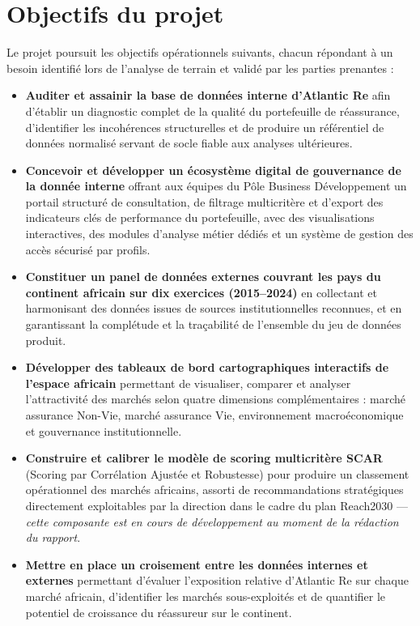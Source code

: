 \documentclass[../main.tex]{subfiles}
\begin{document}
\section{Objectifs du projet}

Le projet poursuit les objectifs opérationnels suivants, chacun répondant à un besoin identifié lors de l'analyse de terrain et validé par les parties prenantes :

\begin{itemize}[leftmargin=1.5cm, itemsep=8pt]

  \item \textbf{Auditer et assainir la base de données interne d'Atlantic Re} afin d'établir un diagnostic complet de la qualité du portefeuille de réassurance, d'identifier les incohérences structurelles et de produire un référentiel de données normalisé servant de socle fiable aux analyses ultérieures.

  \item \textbf{Concevoir et développer un écosystème digital de gouvernance de la donnée interne} offrant aux équipes du Pôle Business Développement un portail structuré de consultation, de filtrage multicritère et d'export des indicateurs clés de performance du portefeuille, avec des visualisations interactives, des modules d'analyse métier dédiés et un système de gestion des accès sécurisé par profils.

  \item \textbf{Constituer un panel de données externes couvrant les pays du continent africain sur dix exercices (2015--2024)} en collectant et harmonisant des données issues de sources institutionnelles reconnues, et en garantissant la complétude et la traçabilité de l'ensemble du jeu de données produit.

  \item \textbf{Développer des tableaux de bord cartographiques interactifs de l'espace africain} permettant de visualiser, comparer et analyser l'attractivité des marchés selon quatre dimensions complémentaires : marché assurance Non-Vie, marché assurance Vie, environnement macroéconomique et gouvernance institutionnelle.

  \item \textbf{Construire et calibrer le modèle de scoring multicritère SCAR} (Scoring par Corrélation Ajustée et Robustesse) pour produire un classement opérationnel des marchés africains, assorti de recommandations stratégiques directement exploitables par la direction dans le cadre du plan Reach2030 --- \textit{cette composante est en cours de développement au moment de la rédaction du rapport}.

  \item \textbf{Mettre en place un croisement entre les données internes et externes} permettant d'évaluer l'exposition relative d'Atlantic Re sur chaque marché africain, d'identifier les marchés sous-exploités et de quantifier le potentiel de croissance du réassureur sur le continent.

\end{itemize}
\end{document}
